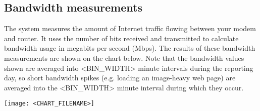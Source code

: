 \subsection{Bandwidth measurements}
The system measures the amount of Internet traffic flowing between your modem and router. It uses the number of bits received and transmitted to calculate bandwidth usage in megabits per second (Mbps). The results of these bandwidth measurements are shown on the chart below. Note that the bandwidth values shown are averaged into <BIN_WIDTH> minute intervals during the reporting day, so short bandwidth spikes (e.g. loading an image-heavy web page) are averaged into the <BIN_WIDTH> minute interval during which they occur.

\begin{center}
\texttt{[image: <CHART\_FILENAME>]}
\end{center}

\pagebreak

